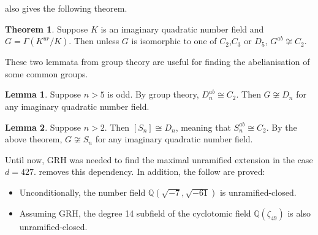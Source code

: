 \documentclass[12pt]{extarticle}
\newcommand{\Q}{\mathbb{Q}}
\newcommand{\<}{\langle}
\renewcommand{\>}{\rangle}
\theoremstyle{definition}
\newtheorem{theorem}{Theorem}
\newtheorem{lemma}{Lemma}
\begin{document}
\cite{YAMAMURA1996} also gives the following theorem. 
\begin{theorem}
Suppose $K$ is an imaginary quadratic number field and $G = \Gamma(K^{ur}/K)$.  Then unless $G$ is isomorphic to one of $C_2$,$C_3$ or $D_5$, $G^{ab} \not \cong C_2$. 
\end{theorem}
These two lemmata from group theory are useful for finding the abelianisation of some common groups. 
\begin{lemma}
Suppose $n>5$ is odd. By group theory, $D_n^{ab} \cong C_2$. Then $G \not \cong D_n$ for any imaginary quadratic number field.
\end{lemma}
\begin{lemma}
Suppose $n>2$. Then $[S_n] \cong D_n$, meaning that $S_n^{ab} \cong C_2$. By the above theorem, $G \not \cong S_n$ for any imaginary quadratic number field.
\end{lemma}
Until now, GRH was needed to find the maximal unramified extension in the case $d = 427$. \cite{Wong2015} removes this dependency. In addition, the follow are proved:
\begin{itemize}
\item Unconditionally, the number field $\Q(\sqrt{-7},\sqrt{-61})$ is unramified-closed.
\item Assuming GRH, the degree 14 subfield of the cyclotomic field $\Q(\zeta_49)$ is also unramified-closed. 
\end{itemize}
\end{document}
